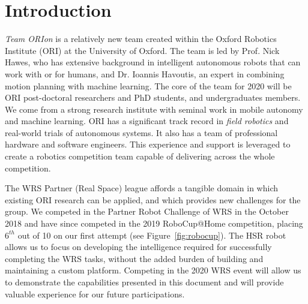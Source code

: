 \documentclass[runningheads,a4paper]{llncs}
\newcommand{\teamori}{Team ORIon}
\begin{document}

\section{Introduction}

\textit{\teamori{}} is a relatively new team created within the Oxford Robotics Institute
(ORI) at the University of Oxford. The team is led by Prof. Nick Hawes, who has extensive background in intelligent autonomous robots that can work with or for humans, and Dr. Ioannis Havoutis, an expert in combining motion planning with machine learning. The core of the team for 2020 will be ORI post-doctoral researchers and PhD students, and undergraduates members. We come from a strong research institute with seminal work in mobile autonomy and machine learning. ORI has a significant track record in \emph{field robotics} and real-world trials of autonomous systems. It also has a team of professional
hardware and software engineers. This experience and support is leveraged
to create a robotics competition team capable of delivering across the whole
competition. 

The WRS Partner (Real Space) league affords a tangible domain in
which existing ORI research can be applied, and which provides new challenges
for the group.
We competed in the Partner Robot Challenge of WRS in the October 2018 and have since competed in the 2019 RoboCup@Home competition, placing $6^{th}$ out of 10 on our first attempt (see Figure~\ref{fig:robocup}). 
The HSR robot allows us to focus on developing the
intelligence required for successfully completing the WRS tasks, 
without the added burden of building and maintaining a custom platform. 
Competing in the 2020 WRS event will allow us to demonstrate 
the capabilities presented in this document and will provide valuable experience
for our future participations.

\end{document}
